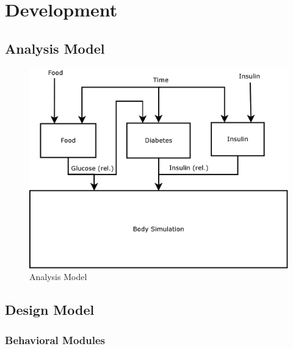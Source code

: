 \documentclass[pdflatex,a4paper,11pt,english]{scrreprt}
\begin{document}
\chapter{Development}




\section{Analysis Model}
\begin{figure}[htb]
\centering
\includegraphics[width=\textwidth]{images/Analysis_Model}
\caption{Analysis Model}
\label{fig:analysis_model}
\end{figure}

\section{Design Model}

\subsection{Behavioral Modules}
\end{document}
